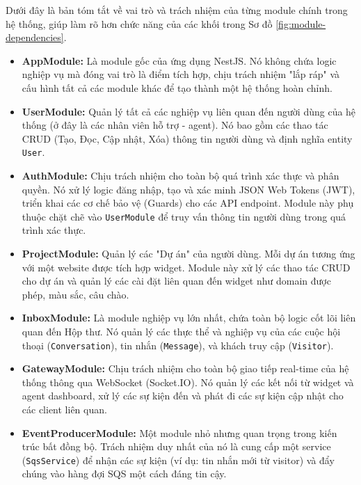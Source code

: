 Dưới đây là bản tóm tắt về vai trò và trách nhiệm của từng module chính trong hệ thống, giúp làm rõ hơn chức năng của các khối trong Sơ đồ \ref{fig:module-dependencies}.

\begin{itemize}
    \item \textbf{AppModule:} Là module gốc của ứng dụng NestJS. Nó không chứa logic nghiệp vụ mà đóng vai trò là điểm tích hợp, chịu trách nhiệm "lắp ráp" và cấu hình tất cả các module khác để tạo thành một hệ thống hoàn chỉnh.

    \item \textbf{UserModule:} Quản lý tất cả các nghiệp vụ liên quan đến người dùng của hệ thống (ở đây là các nhân viên hỗ trợ - agent). Nó bao gồm các thao tác CRUD (Tạo, Đọc, Cập nhật, Xóa) thông tin người dùng và định nghĩa entity \texttt{User}.
    
    \item \textbf{AuthModule:} Chịu trách nhiệm cho toàn bộ quá trình xác thực và phân quyền. Nó xử lý logic đăng nhập, tạo và xác minh JSON Web Tokens (JWT), triển khai các cơ chế bảo vệ (Guards) cho các API endpoint. Module này phụ thuộc chặt chẽ vào \texttt{UserModule} để truy vấn thông tin người dùng trong quá trình xác thực.

    \item \textbf{ProjectModule:} Quản lý các "Dự án" của người dùng. Mỗi dự án tương ứng với một website được tích hợp widget. Module này xử lý các thao tác CRUD cho dự án và quản lý các cài đặt liên quan đến widget như domain được phép, màu sắc, câu chào.
    
    \item \textbf{InboxModule:} Là module nghiệp vụ lớn nhất, chứa toàn bộ logic cốt lõi liên quan đến Hộp thư. Nó quản lý các thực thể và nghiệp vụ của các cuộc hội thoại (\texttt{Conversation}), tin nhắn (\texttt{Message}), và khách truy cập (\texttt{Visitor}).
    
    \item \textbf{GatewayModule:} Chịu trách nhiệm cho toàn bộ giao tiếp real-time của hệ thống thông qua WebSocket (Socket.IO). Nó quản lý các kết nối từ widget và agent dashboard, xử lý các sự kiện đến và phát đi các sự kiện cập nhật cho các client liên quan.

    \item \textbf{EventProducerModule:} Một module nhỏ nhưng quan trọng trong kiến trúc bất đồng bộ. Trách nhiệm duy nhất của nó là cung cấp một service (\texttt{SqsService}) để nhận các sự kiện (ví dụ: tin nhắn mới từ visitor) và đẩy chúng vào hàng đợi SQS một cách đáng tin cậy.
    

\end{itemize}
